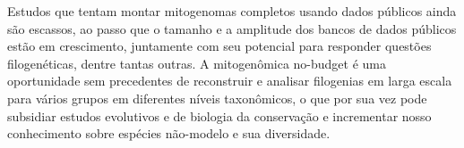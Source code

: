\documentclass[../DISSERTACAO_MAIN.tex]{subfiles}
\begin{document}
	Estudos que tentam montar mitogenomas completos usando dados públicos ainda são escassos, ao passo que o tamanho e a amplitude dos bancos de dados públicos estão em crescimento, juntamente com seu potencial para responder questões filogenéticas, dentre tantas outras. A mitogenômica no-budget é uma oportunidade sem precedentes de reconstruir e analisar filogenias em larga escala para vários grupos em diferentes níveis taxonômicos, o que por sua vez pode subsidiar estudos evolutivos e de biologia da conservação e incrementar nosso conhecimento sobre espécies não-modelo e sua diversidade.
	
\end{document}
